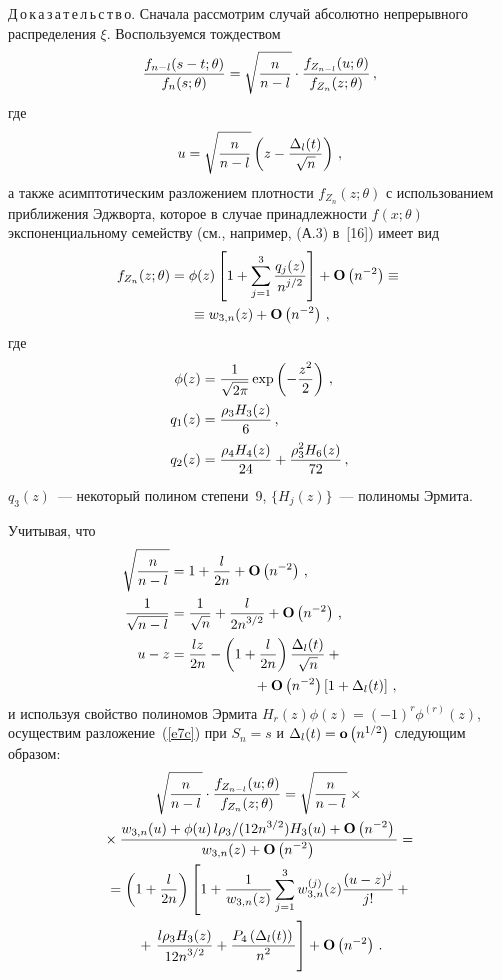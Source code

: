 \begin{multicols}{2}
\smallskip
\noindent
Д\,о\,к\,а\,з\,а\,т\,е\,л\,ь\,с\,т\,в\,о. 
Сначала рассмотрим случай абсолютно
непрерывного распределения $\xi$. Воспользуемся тождеством
  \begin{equation} 
\displaystyle\frac{\displaystyle f_{n-l}(s-t;\theta)\mathstrut}{\displaystyle f_n(s;\theta)\mathstrut}=\sqrt{\displaystyle\frac{\displaystyle n\mathstrut}{\displaystyle n-l\mathstrut}}
     \cdot \displaystyle\frac{\displaystyle f_{Z_{n-l}}(u;\theta)\mathstrut}{\displaystyle f_{Z_n}(z;\theta)\mathstrut}\,,
\label{e13c}
\end{equation}
где 
$$
u=\sqrt{\displaystyle\frac{\displaystyle n\mathstrut}{\displaystyle n-l\mathstrut}} \left(z-\displaystyle\frac{\displaystyle \Delta_l(t)\mathstrut}{\displaystyle \sqrt{n}\mathstrut} \right)\,,
$$
а также асимптотическим разложением плотности
 $f_{Z_n}(z;\theta)$ с использованием приближения Эджворта,
 которое в случае принадлежности $f(x;\theta)$ экспоненциальному
  семейству (см., например, (А.3) в~[16]) имеет вид
  \begin{multline*}    
f_{Z_n}(z;\theta)=\phi(z)\left[1+
         \sum_{j=1}^3 \displaystyle\frac{\displaystyle q_{j}(z)\mathstrut}{\displaystyle n^{j/2}\mathstrut} \right]+
         {\bf O}\left(n^{-2}\right)\equiv {}\\
         {}\equiv w_{3,n}(z)+
         {\bf O}\left(n^{-2}\right)\,,
  \end{multline*}
  где
  \begin{align*}
  \phi(z)&=\displaystyle\frac{\displaystyle 1\mathstrut}{\displaystyle \sqrt{2\pi}\mathstrut}\exp\left(-\displaystyle\frac{\displaystyle z^2\mathstrut}{\displaystyle 2\mathstrut}\right)\,,\\
  q_{1}(z)&=\displaystyle\frac{\displaystyle \rho_3H_3(z)\mathstrut}{\displaystyle 6\mathstrut}\,,\\
  q_{2}(z)&=\displaystyle\frac{\displaystyle \rho_4H_4(z)\mathstrut}{\displaystyle 24\mathstrut}+\displaystyle\frac{\displaystyle \rho_3^2H_6(z)\mathstrut}{\displaystyle 72\mathstrut}\,,
\end{align*}
  $q_{3}(z)$~--- некоторый полином степени~9, $\{H_j(z)\}$~--- полиномы
  Эрмита.

  Учитывая, что
  \begin{align*}  
\sqrt{\displaystyle\frac{\displaystyle n\mathstrut}{\displaystyle n-l\mathstrut}}&=1+\displaystyle\frac{\displaystyle l\mathstrut}{\displaystyle 2n\mathstrut}+
      {\bf O}\left(n^{-2}\right)\,,\\
\displaystyle\frac{\displaystyle 1\mathstrut}{\displaystyle \sqrt{n-l}\mathstrut}&=\displaystyle\frac{\displaystyle 1\mathstrut}{\displaystyle \sqrt{n}\mathstrut}+\displaystyle\frac{\displaystyle l\mathstrut}{\displaystyle 2n^{3/2}\mathstrut}+
       {\bf O}\left(n^{-2}\right)\,,\\
  u-z&=\displaystyle\frac{\displaystyle l z\mathstrut}{\displaystyle 2n\mathstrut}-\left(1+\displaystyle\frac{\displaystyle l\mathstrut}{\displaystyle 2n\mathstrut} \right)
      \displaystyle\frac{\displaystyle \Delta_l(t)\mathstrut}{\displaystyle \sqrt{n}\mathstrut}+ {}\\
&\ \ \ \ \ \ \ \ \ \ \ \ \ \ \ \ \ \       {}+{\bf O}\left(n^{-2}\right)\left [1+\Delta_l(t)\right]\,,
\end{align*}
  и используя свойство полиномов Эрмита
  $H_r(z) \phi(z)=(-1)^r \phi^{(r)}(z)$,
  осуществим разложение~(\ref{e7c}) при $S_n=s$ и
  $\Delta_l(t)={\bf o}\left(n^{1/2}\right)$ следующим образом:
\begin{multline}  
\sqrt{\fr{n}{n-l}}\cdot
      \fr{f_{Z_{n-l}}(u;\theta)}{f_{Z_n}(z;\theta)}=
     \sqrt{\fr{n}{n-l}}\times{}\\
     {}\times
      \fr{w_{3,n}(u)+
      \phi(u)\, l\rho_3/(12n^{3/2}) H_3(u)+
      {\bf O}\left(n^{-2}\right)}
      {w_{3,n}(z)+{\bf O}\left(n^{-2}\right)}={}\\
{}    =\left(1+\fr{l}{2n} \right) \left[1+
         \fr{1}{w_{3,n}(z)}\sum_{j=1}^3 w_{3,n}^{(j)}(z)
         \fr{(u-z)^j}{j!} +{}\right.\\
         {}+\left.
         \fr{l\rho_3 H_3(z)}{12n^{3/2}}+
         \fr{P_4\left(\Delta_l(t) \right)}{n^2}
         \vphantom{\sum_{j=1}^3 \fr{(u-z)^j}{j!}}\right ] +
         {\bf O}\left(n^{-2}\right)\,.
      \label{e14c}
  \end{multline}


\end{multicols}
